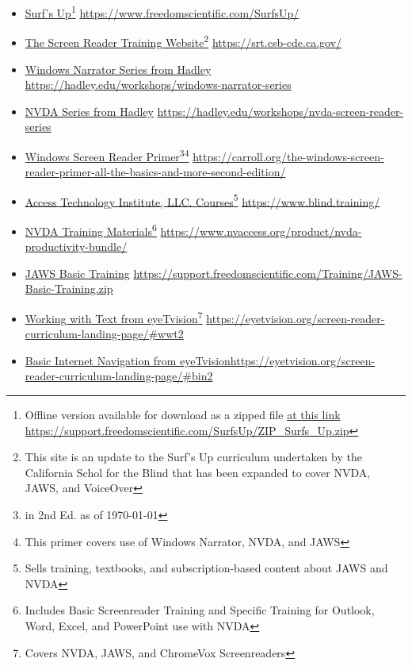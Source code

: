 \begin{itemize}[leftmargin=*]
\item \href{https://www.freedomscientific.com/SurfsUp/}{Surf's Up}\footnote{\raggedright Offline version available for download as a zipped file \href{https://support.freedomscientific.com/SurfsUp/ZIP_Surfs_Up.zip}{at this link} \break\url{https://support.freedomscientific.com/SurfsUp/ZIP_Surfs_Up.zip}} \break\url{https://www.freedomscientific.com/SurfsUp/}
\item \href{https://srt.csb-cde.ca.gov/}{The Screen Reader Training Website}\footnote{\raggedright This site is an update to the Surf's Up curriculum undertaken by the California Schol for the Blind that has been expanded to cover NVDA, JAWS, and VoiceOver} \break\url{https://srt.csb-cde.ca.gov/}
\item \href{https://hadley.edu/workshops/windows-narrator-series}{Windows Narrator Series from Hadley} \break\url{https://hadley.edu/workshops/windows-narrator-series}
\item \href{https://hadley.edu/workshops/nvda-screen-reader-series}{NVDA Series from Hadley} \break\url{https://hadley.edu/workshops/nvda-screen-reader-series}
\item \href{https://carroll.org/the-windows-screen-reader-primer-all-the-basics-and-more-second-edition/}{Windows Screen Reader Primer}\footnote{\raggedright in 2nd Ed. as of \today}\fnsep\footnote{\raggedright This primer covers use of Windows Narrator, NVDA, and JAWS} \break\url{https://carroll.org/the-windows-screen-reader-primer-all-the-basics-and-more-second-edition/}
\item \href{https://www.blind.training/}{Access Technology Institute, LLC. Courses}\footnote{\raggedright Sells training, textbooks, and subscription-based content about JAWS and NVDA} \break\url{https://www.blind.training/}
\item \href{https://www.nvaccess.org/product/nvda-productivity-bundle/}{NVDA Training Materials}\footnote{\raggedright Includes Basic Screenreader Training and Specific Training for Outlook, Word, Excel, and PowerPoint use with NVDA} \break\url{https://www.nvaccess.org/product/nvda-productivity-bundle/}
\item \href{https://support.freedomscientific.com/Training/JAWS-Basic-Training.zip}{JAWS Basic Training} \break\url{https://support.freedomscientific.com/Training/JAWS-Basic-Training.zip}
\item \href{https://eyetvision.org/screen-reader-curriculum-landing-page/#wwt2}{Working with Text  from eyeTvision}\footnote{\raggedright Covers NVDA, JAWS, and ChromeVox Screenreaders} \url{https://eyetvision.org/screen-reader-curriculum-landing-page/#wwt2}
\item \href{https://eyetvision.org/screen-reader-curriculum-landing-page/#bin2}{Basic Internet Navigation from eyeTvision}\footnotemark[\value{footnote}] \break\url{https://eyetvision.org/screen-reader-curriculum-landing-page/#bin2}
\end{itemize}

